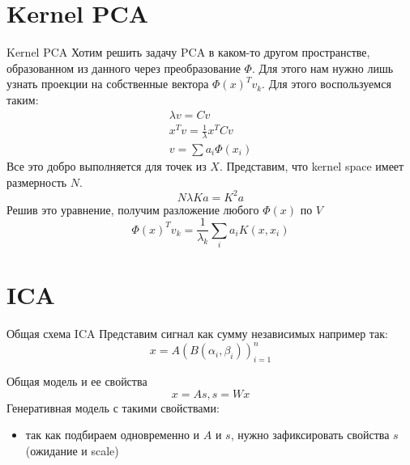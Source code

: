 \documentclass[14pt, fleqn, xcolor={dvipsnames, table}]{beamer}
\begin{document}
\section{Kernel PCA}
\begin{frame}{Kernel PCA}
\footnotesize
Хотим решить задачу PCA в каком-то другом пространстве, образованном из данного через преобразование $\Phi$. Для этого нам нужно лишь узнать проекции на собственные вектора $\Phi(x)^T v_k$. Для этого воспользуемся таким:
$$\begin{array}{l}
\lambda v = Cv \\
x^T v = \frac{1}{\lambda} x^T Cv \\
v = \sum a_i \Phi(x_i)
\end{array}$$
Все это добро выполняется для точек из $X$. Представим, что kernel space имеет размерность $N$.
$$
N \lambda K a = K^2 a
$$
Решив это уравнение, получим разложение любого $\Phi(x)$ по $V$
$$
\Phi(x)^Tv_k = \frac{1}{\lambda_k} \sum_i a_i K(x, x_i)
$$
\end{frame}

\section{ICA}
\begin{frame}{Общая схема ICA}
Представим сигнал как сумму независимых например так:
$$x = A (B(\alpha_i, \beta_i))_{i=1}^n$$
\end{frame}

\begin{frame}{Общая модель и ее свойства}
\small
$$
x = As, s = Wx
$$
Генеративная модель с такими свойствами:
\begin{itemize}\footnotesize
  \item так как подбираем одновременно и $A$ и $s$, нужно зафиксировать свойства $s$ (ожидание и scale)
\end{itemize}
\end{frame}
\end{document}
